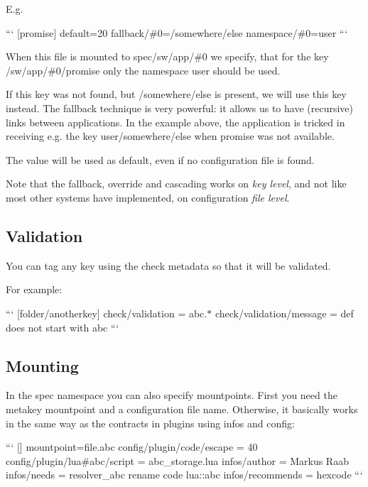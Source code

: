 E.\+g.

``` \mbox{[}promise\mbox{]} default=20 fallback/\#0=/somewhere/else namespace/\#0=user ```


\begin{DoxyEnumerate}
\item When this file is mounted to {\ttfamily spec/sw/app/\#0} we specify, that for the key {\ttfamily /sw/app/\#0/promise} only the namespace {\ttfamily user} should be used.
\item If this key was not found, but {\ttfamily /somewhere/else} is present, we will use this key instead. The {\ttfamily fallback} technique is very powerful\+: it allows us to have (recursive) links between applications. In the example above, the application is tricked in receiving e.\+g. the key {\ttfamily user/somewhere/else} when {\ttfamily promise} was not available.
\item The value {} will be used as default, even if no configuration file is found.
\end{DoxyEnumerate}

Note that the fallback, override and cascading works on {\itshape key level}, and not like most other systems have implemented, on configuration {\itshape file level}.

\subsection*{Validation}

You can tag any key using the {\ttfamily check} metadata so that it will be validated.

For example\+:

``` \mbox{[}folder/anotherkey\mbox{]} check/validation = abc.$\ast$ check/validation/message = def does not start with abc ```

\subsection*{Mounting}

In the spec namespace you can also specify mountpoints. First you need the metakey {\ttfamily mountpoint} and a configuration file name. Otherwise, it basically works in the same way as the contracts in plugins using {\ttfamily infos} and {\ttfamily config}\+:

``` \mbox{[}\mbox{]} mountpoint=file.\+abc config/plugin/code/escape = 40 config/plugin/lua\#abc/script = abc\+\_\+storage.\+lua infos/author = Markus Raab infos/needs = resolver\+\_\+abc rename code lua\+::abc infos/recommends = hexcode ```

